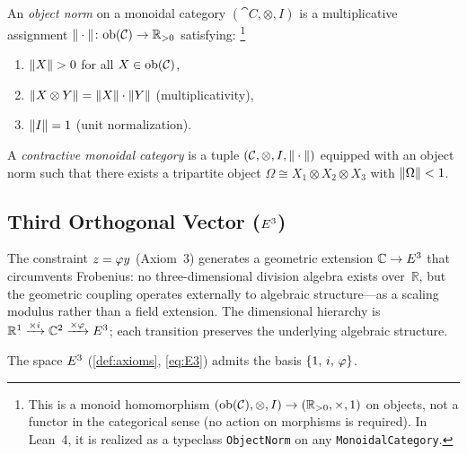 \begin{Definition}\label{def:object-norm}
An \emph{object norm} on a monoidal category $(\cat{C},\otimes,I)$ is a
multiplicative assignment $\|\cdot\|\colon\mathrm{ob}(\mathcal{C})\to\mathbb{R}_{>0}$
satisfying:%
\footnote{This is a monoid homomorphism $(\mathrm{ob}(\mathcal{C}),\otimes,I)\to(\mathbb{R}_{>0},\times,1)$
on objects, not a functor in the categorical sense (no action on morphisms
is required).  In Lean~4, it is realized as a typeclass \texttt{ObjectNorm}
on any \texttt{MonoidalCategory}.}
\begin{enumerate}[label=(N\arabic*)]
  \item $\norm{X}>0$ for all $X\in\mathrm{ob}(\mathcal{C})$,
  \item $\|X\otimes Y\|=\|X\|\cdot\|Y\|$ \quad(multiplicativity),
  \item $\|I\|=1$ \quad(unit normalization).
\end{enumerate}
\end{Definition}

\begin{Definition}\label{def:contractive-cat}
A \emph{contractive monoidal category} is a tuple
$(\mathcal{C},\otimes,I,\|\cdot\|)$ equipped with an object norm such that
there exists a tripartite object $\Omega\cong X_1\otimes X_2\otimes X_3$ with
$\|\Omega\|<1$.
\end{Definition}


\subsection{Third Orthogonal Vector (\texorpdfstring{$E^3$}{E3})}\label{ssec:E3}

The constraint $z=\varphi y$ (Axiom~3) generates a geometric extension
$\mathbb{C}\to E^3$ that circumvents Frobenius: no three-dimensional
division algebra exists over~$\mathbb{R}$, but the geometric coupling
operates externally to algebraic structure---as a scaling modulus rather
than a field extension.  The dimensional hierarchy is
$\mathbb{R}^1\xrightarrow{\times i}\mathbb{C}^2\xrightarrow{\times\varphi}E^3$;
each transition preserves the underlying algebraic structure.

\begin{Proposition}\label{prop:E3-basis}
The space $E^3$ (\cref{def:axioms},
\cref{eq:E3}) admits the basis $\{1,\, i,\, \varphi\}$.
\end{Proposition}

